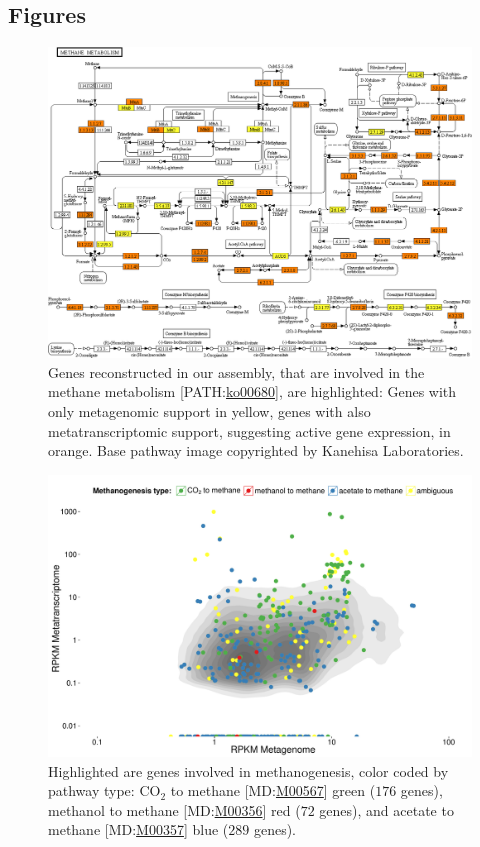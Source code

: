 \documentclass{bmcart}
\begin{document}
\begin{backmatter}
\section*{Figures}
\begin{figure}[h!]
\centering
\includegraphics[width=.9\textwidth]{map00680_cropped}
\caption{ Genes reconstructed in our assembly, that are involved in the methane metabolism [PATH:\href{http://www.genome.jp/kegg-bin/show_pathway?ko00680}{ko00680}], are highlighted: Genes with only metagenomic support in yellow, genes with also metatranscriptomic support, suggesting active gene expression, in orange.
Base pathway image copyrighted by Kanehisa Laboratories.}
\label{fPathway}
\end{figure}
\begin{figure}[h!]
\centering
\includegraphics[width=.9\textwidth]{Rplot}
\caption{ Highlighted are genes involved in methanogenesis, color coded by pathway type: CO$_{\text{2}}$ to methane [MD:\href{http://www.kegg.jp/kegg-bin/show_module?M00567}{M00567}] green ($176$ genes), methanol to methane [MD:\href{http://www.kegg.jp/kegg-bin/show_module?M00356}{M00356}] red ($72$ genes), and acetate to methane [MD:\href{http://www.kegg.jp/kegg-bin/show_module?M00357}{M00357}] blue ($289$ genes).}
\label{fCoverage}
\end{figure}


\end{backmatter}
\end{document}
